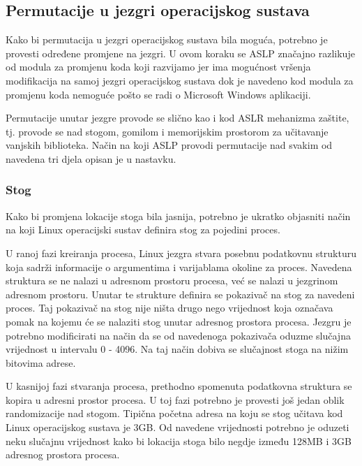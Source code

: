 \documentclass[times, utf8, diplomski, numeric]{fer}
\begin{document}
\subsection{Permutacije u jezgri operacijskog sustava}

Kako bi permutacija u jezgri operacijskog sustava bila moguća,
potrebno je provesti određene promjene na jezgri. U ovom koraku
se ASLP značajno razlikuje od modula za promjenu koda koji
razvijamo jer ima			%
mogućnost vršenja modifikacija na samoj jezgri operacijskog
sustava dok je navedeno kod modula za promjenu koda nemoguće pošto
se radi o Microsoft Windows aplikaciji.

Permutacije unutar jezgre provode se slično kao i kod ASLR
mehanizma zaštite, tj. provode se nad stogom, gomilom i
memorijskim prostorom za učitavanje vanjskih biblioteka. Način na
koji ASLP provodi permutacije nad svakim od navedena tri djela
opisan je u nastavku.

\subsubsection{Stog}

Kako bi promjena lokacije stoga bila jasnija, potrebno je ukratko
objasniti način na koji Linux operacijski sustav definira stog za
pojedini proces. 

U ranoj fazi kreiranja procesa, Linux jezgra stvara posebnu
podatkovnu strukturu koja sadrži informacije o argumentima i
varijablama okoline za proces. Navedena struktura se ne nalazi u
adresnom prostoru procesa, već se nalazi u jezgrinom adresnom
prostoru. Unutar te strukture definira se pokazivač na stog za
navedeni proces. Taj pokazivač na stog nije ništa drugo nego
vrijednost koja označava pomak na kojemu će se nalaziti stog
unutar adresnog prostora procesa. Jezgru je potrebno modificirati
na način da se od navedenoga pokazivača oduzme slučajna
vrijednost u intervalu 0 - 4096. Na taj način dobiva se
slučajnost stoga na nižim bitovima adrese.

U kasnijoj fazi stvaranja procesa, prethodno spomenuta podatkovna
struktura se kopira u adresni prostor procesa. U toj fazi
potrebno je provesti još jedan oblik randomizacije nad stogom.
Tipična početna adresa na koju se stog učitava kod Linux
operacijskog sustava je 3GB. Od navedene vrijednosti potrebno je
oduzeti neku slučajnu vrijednost kako bi lokacija stoga bilo
negdje između 128MB i 3GB adresnog prostora procesa.
\end{document}
